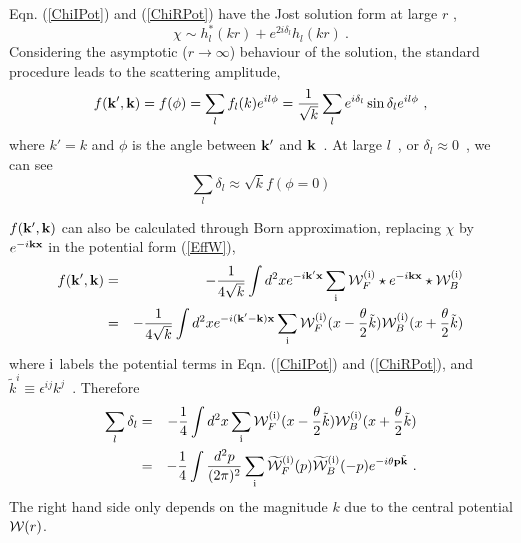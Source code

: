 \documentclass[a4paper,a4paper]{article}
\def\cW{{\cal W}}
\def\bp{{\bf p}}
\def\bk{{{\bf k}}}
\def\tk{{\tilde{k}}}
\def\bx{{{\bf x}}}
\def\tbk{{\tilde{\bk}}}
\def\ftheta{{\frac{\theta}2}}
\def\rmi{{\rm i}}
\begin{document}
Eqn. (\ref{ChiIPot}) and (\ref{ChiRPot}) have the Jost solution form at large $r$ , 
\begin{equation}
  \chi\sim h_l^*(kr)+e^{2i\delta_l}h_l(kr)\ .
\end{equation}
Considering the asymptotic ($r\rightarrow\infty$) behaviour of the solution, 
the standard procedure \cite{Sakurai} leads to the scattering amplitude, 
\begin{equation}
  f(\bk ',\bk)=f(\phi)=\sum_lf_l(k)e^{il\phi}
=\frac 1{\sqrt{k}}\sum_le^{i\delta_l}\sin\delta_le^{il\phi}\ ,
\end{equation}
where $k'=k$ and $\phi$ is the angle between $\bk '$ and $\bk$\ . 
At large $l$\ , or $\delta_l\approx 0$\ , we can see 
\begin{equation}
  \sum_l\delta_l\approx \sqrt{k}f(\phi=0) 
\end{equation}

$f(\bk ',\bk)$ can also be calculated through Born approximation, 
replacing $\chi$ by $e^{-i\bk\bx}$ in the potential form (\ref{EffW}), 
\begin{eqnarray}
  f(\bk ',\bk)&=&-\frac 1{4\sqrt{k}}\int d^2xe^{-i\bk ' \bx}
\sum_\rmi\cW_F^{(\rmi)}\star e^{-i\bk \bx}
\star\cW_B^{(\rmi)}\nonumber\\
&=&-\frac 1{4\sqrt{k}}\int d^2xe^{-i(\bk '-\bk)\bx}\sum_\rmi
\cW_F^{(\rmi)}(x-\ftheta \tk)\cW_B^{(\rmi)}(x+\ftheta \tk)
\end{eqnarray}
where ${\rm i}$ labels the potential terms in Eqn. (\ref{ChiIPot}) and 
(\ref{ChiRPot}), and $\tk^i\equiv\epsilon^{ij}k^j$\ . Therefore 
\begin{eqnarray}
  \sum_l\delta_l&=&-\frac 14\int d^2x\sum_\rmi\cW_F^{(\rmi)}(x-\ftheta\tk)
\cW_B^{(\rmi)}(x+\ftheta\tk)\nonumber\\
&=&-\frac 14\int \frac{d^2p}{(2\pi)^2}\sum_\rmi\widetilde{\cW}^{(\rmi)}_F(p)
\widetilde{\cW}^{(\rmi)}_B(-p)e^{-i\theta \bp\tbk}\ .
\end{eqnarray}
The right hand side only depends on the magnitude $k$ due to the central 
potential $\cW(r)$. 
\end{document}
